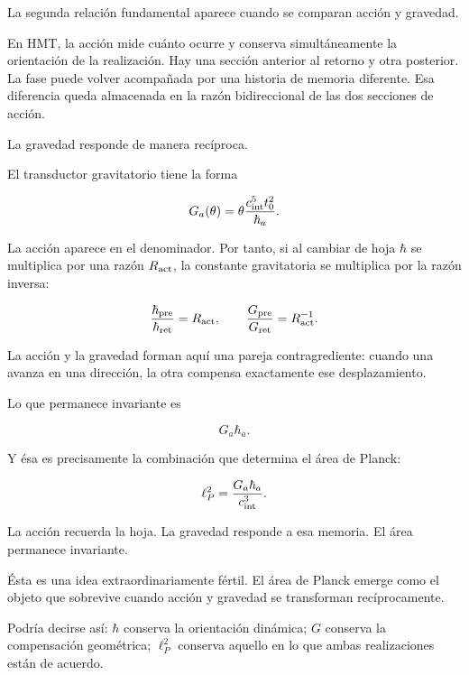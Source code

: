 La segunda relación fundamental aparece cuando se comparan acción y gravedad.\par

En HMT, la acción mide cuánto ocurre y conserva simultáneamente la orientación de la realización. Hay una sección anterior al retorno y otra posterior. La fase puede volver acompañada por una historia de memoria diferente. Esa diferencia queda almacenada en la razón bidireccional de las dos secciones de acción.\par

La gravedad responde de manera recíproca.\par

El transductor gravitatorio tiene la forma\par

\[
G_a(\theta)
=
\theta\frac{c_{\rm int}^{5}t_0^2}{\hbar_a}.
\]

La acción aparece en el denominador. Por tanto, si al cambiar de hoja \(\hbar\) se multiplica por una razón \(R_{\rm act}\), la constante gravitatoria se multiplica por la razón inversa:\par

\[
\frac{\hbar_{\rm pre}}{\hbar_{\rm ret}}
=
R_{\rm act},
\qquad
\frac{G_{\rm pre}}{G_{\rm ret}}
=
R_{\rm act}^{-1}.
\]

La acción y la gravedad forman aquí una pareja contragrediente: cuando una avanza en una dirección, la otra compensa exactamente ese desplazamiento.\par

Lo que permanece invariante es\par

\[
G_a\hbar_a.
\]

Y ésa es precisamente la combinación que determina el área de Planck:\par

\[
\ell_P^2=\frac{G_a\hbar_a}{c_{\rm int}^3}.
\]

La acción recuerda la hoja. La gravedad responde a esa memoria. El área permanece invariante.\par

Ésta es una idea extraordinariamente fértil. El área de Planck emerge como el objeto que sobrevive cuando acción y gravedad se transforman recíprocamente.\par

Podría decirse así: \(\hbar\) conserva la orientación dinámica; \(G\) conserva la compensación geométrica; \(\ell_P^2\) conserva aquello en lo que ambas realizaciones están de acuerdo.\par


